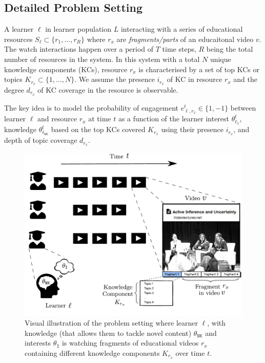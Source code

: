 \documentclass[letterpaper]{article} %
\begin{document}
\subsection{Detailed Problem Setting}

A learner $\ell$ in learner population $L$ interacting with a series of educational resources $S_\ell \subset \{r_1, \ldots, r_{R}\}$ where $r_x$ are \emph{fragments/parts} of an educaitonal video $v$. The watch interactions happen over a period of $T$ time steps, $R$ being the total number of resources in the system.
In this system with a total $N$ unique knowledge components (KCs), resource $r_x$ is characterised by a set of top KCs or topics $K_{r_x} \subset \{1, \ldots, N \}$. We assume the presence $i_{r_x}$ of KC in resource $r_x$ and the degree $d_{r_x}$ of KC coverage in the resource is observable.

The key idea is to model the probability of engagement $e_{\ell, r_x}^{t} \in \{ 1, -1\}$ between learner $\ell$ and resource $r_x$ at time $t$ as a function of the learner interest $\theta^t_{\ell_{\texttt{I}}}$, knowledge $\theta^t_{\ell_{\texttt{NK}}}$ based on the top KCs covered $K_{r_x}$ using their presence $i_{r_x}$, and depth of topic coverage $d_{r_x}$.

\begin{figure}[H]
\begin{center}
\centerline{\includegraphics[width=0.65\columnwidth]{problem_setting.pdf}}
\caption{Visual illustration of the problem setting where learner $\ell$, with knowledge (that allows them to tackle novel content) $\theta_\texttt{NK}$ and interests $\theta_\texttt{I}$ is watching fragments of educational videos $r_x$ containing different knowledge components $K_{r_x}$ over time $t$.}
\label{fig:semantic_rel_problem}
\end{center}
\end{figure}
\end{document}
